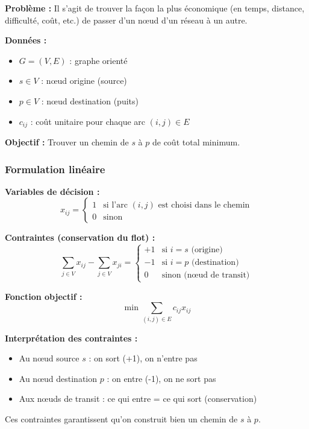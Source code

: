\documentclass[12pt,a4paper]{article}
\begin{document}
\begin{definition}
\textbf{Problème :} Il s'agit de trouver la façon la plus économique (en temps, distance, difficulté, coût, etc.) de passer d'un nœud d'un réseau à un autre.

\textbf{Données :}
\begin{itemize}
    \item $G = (V, E)$ : graphe orienté
    \item $s \in V$ : nœud origine (source)
    \item $p \in V$ : nœud destination (puits)
    \item $c_{ij}$ : coût unitaire pour chaque arc $(i,j) \in E$
\end{itemize}

\textbf{Objectif :} Trouver un chemin de $s$ à $p$ de coût total minimum.
\end{definition}

\subsubsection{Formulation linéaire}

\begin{definition}
\textbf{Variables de décision :}
$$x_{ij} = \begin{cases}
1 & \text{si l'arc } (i,j) \text{ est choisi dans le chemin}\\
0 & \text{sinon}
\end{cases}$$

\textbf{Contraintes (conservation du flot) :}
$$\sum_{j \in V} x_{ij} - \sum_{j \in V} x_{ji} = \begin{cases}
+1 & \text{si } i = s \text{ (origine)}\\
-1 & \text{si } i = p \text{ (destination)}\\
0 & \text{sinon (nœud de transit)}
\end{cases}$$

\textbf{Fonction objectif :}
$$\min \sum_{(i,j) \in E} c_{ij} x_{ij}$$
\end{definition}

\begin{notecours}
\textbf{Interprétation des contraintes :}

\begin{itemize}
    \item Au nœud source $s$ : on sort (+1), on n'entre pas
    \item Au nœud destination $p$ : on entre (-1), on ne sort pas
    \item Aux nœuds de transit : ce qui entre = ce qui sort (conservation)
\end{itemize}

Ces contraintes garantissent qu'on construit bien un chemin de $s$ à $p$.
\end{notecours}
\end{document}
